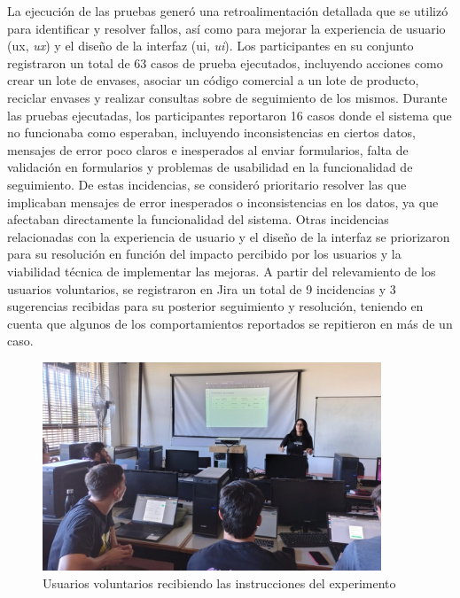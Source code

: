 La ejecución de las pruebas generó una retroalimentación detallada que se utilizó para identificar y resolver fallos, así como para mejorar la experiencia de usuario (\acrshort{ux}, \textit{\acrlong{ux}}) y el diseño de la interfaz (\acrshort{ui}, \textit{\acrlong{ui}}). Los participantes en su conjunto registraron un total de 63 casos de prueba ejecutados, incluyendo acciones como crear un lote de envases, asociar un código comercial a un lote de producto, reciclar envases y realizar consultas sobre de seguimiento de los mismos. Durante las pruebas ejecutadas, los participantes reportaron 16 casos donde el sistema que no funcionaba como esperaban, incluyendo inconsistencias en ciertos datos, mensajes de error poco claros e inesperados al enviar formularios, falta de validación en formularios y problemas de usabilidad en la funcionalidad de seguimiento. De estas incidencias, se consideró prioritario resolver las que implicaban mensajes de error inesperados o inconsistencias en los datos, ya que afectaban directamente la funcionalidad del sistema. Otras incidencias relacionadas con la experiencia de usuario y el diseño de la interfaz se priorizaron para su resolución en función del impacto percibido por los usuarios y la viabilidad técnica de implementar las mejoras. A partir del relevamiento de los usuarios voluntarios, se registraron en Jira un total de 9 incidencias y 3 sugerencias recibidas para su posterior seguimiento y resolución, teniendo en cuenta que algunos de los comportamientos reportados se repitieron en más de un caso. 

\begin{figure}[!tb]
\centering
\includegraphics[width=0.9\textwidth]{Figures/uat-1.jpg}
\caption{Usuarios voluntarios recibiendo las instrucciones del experimento}
\label{fig:uat-picture-1}
\end{figure}

